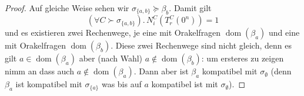 \documentclass[nofonts]{uebung}
\DeclareMathOperator{\dom}{dom}
\begin{document}
\begin{proof}
    Auf gleiche Weise sehen wir $\sigma_{\{a,b\}} \succeq \beta_b$.
    Damit gilt 
    \[ (\forall C\succ \sigma_{\{a,b\}}).\, N^C_i(T^C_r(0^n))=1 \]
    und es existieren zwei Rechenwege, je eine mit Orakelfragen $\dom(\beta_a)$ und eine mit Orakelfragen $\dom(\beta_b)$.
    Diese zwei Rechenwege sind nicht gleich, denn es gilt $a\in\dom(\beta_a)$ aber (nach Wahl) $a\not\in\dom(\beta_b)$: um ersteres zu zeigen nimm an dass auch $a\not\in\dom(\beta_a)$.
    Dann aber ist $\beta_a$ kompatibel mit $\sigma_\emptyset$ (denn $\beta_a$ ist kompatibel mit $\sigma_{\{a\}}$ was bis auf $a$ kompatibel ist mit $\sigma_\emptyset$).

\end{proof}
\end{document}
